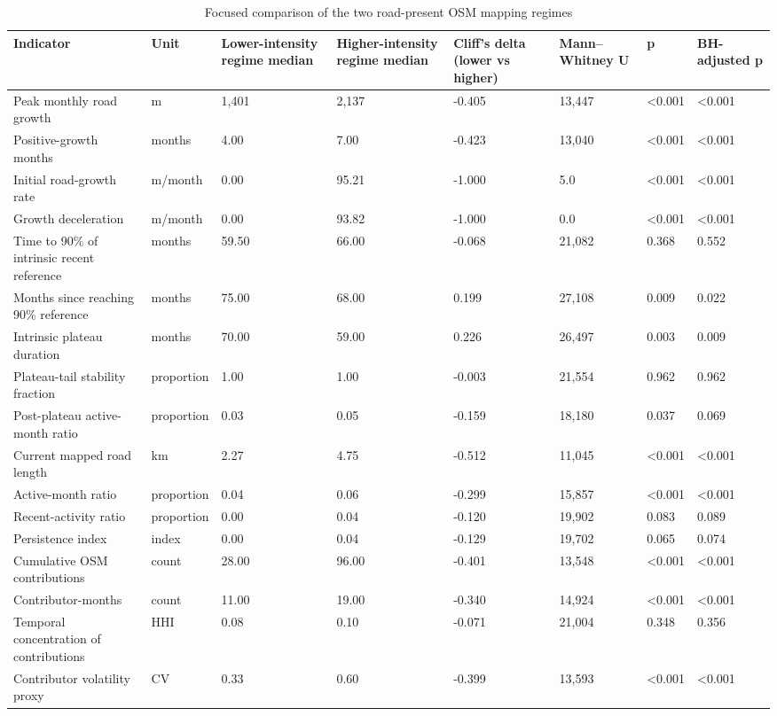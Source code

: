 \begin{table}
\caption{Focused comparison of the two road-present OSM mapping regimes}
\label{tab:table_03_road_present_regime_comparison}
\begin{tabular}{llllllll}
\toprule
Indicator & Unit & Lower-intensity regime median & Higher-intensity regime median & Cliff's delta (lower vs higher) & Mann–Whitney U & p & BH-adjusted p \\
\midrule
Peak monthly road growth & m & 1,401 & 2,137 & -0.405 & 13,447 & <0.001 & <0.001 \\
Positive-growth months & months & 4.00 & 7.00 & -0.423 & 13,040 & <0.001 & <0.001 \\
Initial road-growth rate & m/month & 0.00 & 95.21 & -1.000 & 5.0 & <0.001 & <0.001 \\
Growth deceleration & m/month & 0.00 & 93.82 & -1.000 & 0.0 & <0.001 & <0.001 \\
Time to 90\% of intrinsic recent reference & months & 59.50 & 66.00 & -0.068 & 21,082 & 0.368 & 0.552 \\
Months since reaching 90\% reference & months & 75.00 & 68.00 & 0.199 & 27,108 & 0.009 & 0.022 \\
Intrinsic plateau duration & months & 70.00 & 59.00 & 0.226 & 26,497 & 0.003 & 0.009 \\
Plateau-tail stability fraction & proportion & 1.00 & 1.00 & -0.003 & 21,554 & 0.962 & 0.962 \\
Post-plateau active-month ratio & proportion & 0.03 & 0.05 & -0.159 & 18,180 & 0.037 & 0.069 \\
Current mapped road length & km & 2.27 & 4.75 & -0.512 & 11,045 & <0.001 & <0.001 \\
Active-month ratio & proportion & 0.04 & 0.06 & -0.299 & 15,857 & <0.001 & <0.001 \\
Recent-activity ratio & proportion & 0.00 & 0.04 & -0.120 & 19,902 & 0.083 & 0.089 \\
Persistence index & index & 0.00 & 0.04 & -0.129 & 19,702 & 0.065 & 0.074 \\
Cumulative OSM contributions & count & 28.00 & 96.00 & -0.401 & 13,548 & <0.001 & <0.001 \\
Contributor-months & count & 11.00 & 19.00 & -0.340 & 14,924 & <0.001 & <0.001 \\
Temporal concentration of contributions & HHI & 0.08 & 0.10 & -0.071 & 21,004 & 0.348 & 0.356 \\
Contributor volatility proxy & CV & 0.33 & 0.60 & -0.399 & 13,593 & <0.001 & <0.001 \\
\bottomrule
\end{tabular}
\end{table}

